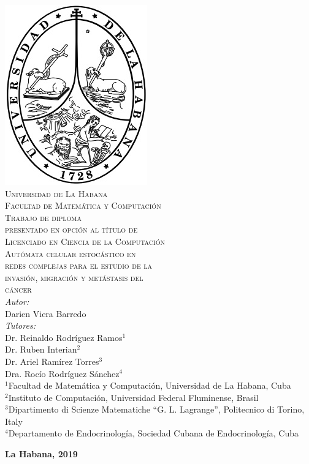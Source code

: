 \begin{center}
\includegraphics[scale=0.6]{img/uhshield.png}\\[0.5cm]
\textsc{\LARGE Universidad de La Habana}\\[0.2cm]
\textsc{\LARGE Facultad de Matem\'atica y Computaci\'on}\\[1.0cm]
\textsc{\LARGE Trabajo de diploma}\\[0.2cm]
\textsc{\LARGE presentado en opci\'on al t\'itulo de }\\[0.2cm]
\textsc{\LARGE Licenciado en Ciencia de la Computaci\'on}\\[1.0cm]
\textsc{\LARGE Aut\'omata celular estoc\'astico en}\\[0.2cm]
\textsc{\LARGE redes complejas para el estudio de la}\\[0.2cm]
\textsc{\LARGE invasi\'on, migraci\'on y met\'astasis del}\\[0.2cm]
\textsc{\LARGE c\'ancer}\\[1.0cm]

\emph{Autor:} \\
Darien Viera Barredo \\[1.0cm]

\emph{Tutores:} \\
Dr. Reinaldo Rodr\'iguez Ramos$^1$ \\
Dr. Ruben Interian$^2$ \\
Dr. Ariel Ram\'irez Torres$^3$ \\
Dra. Roc\'io Rodr\'iguez S\'anchez$^4$ \\[1.0cm]

$^1$Facultad de Matem\'atica y Computaci\'on, Universidad de La Habana, Cuba \\
$^2$Instituto de Computaci\'on, Universidad Federal Fluminense, Brasil \\
$^3$Dipartimento di Scienze Matematiche ``G. L. Lagrange'', Politecnico di Torino, Italy \\
$^4$Departamento de Endocrinolog\'ia, Sociedad Cubana de Endocrinolog\'ia, Cuba

\vfill {\large \textbf{La Habana, 2019}}
\end{center}